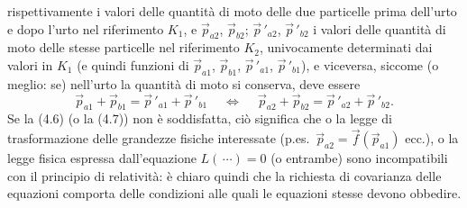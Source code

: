 rispettivamente i valori delle quantit\`a di moto delle due particelle prima
dell'urto e dopo l'urto nel riferimento $K_1$, e $\vec p_{a2}$, $\vec p_{b2}$;
$\vec p\,'_{a2}$, $\vec p\,'_{b2}$ i valori delle quantit\`a di moto delle
stesse particelle nel riferimento $K_2$, univocamente determinati dai valori in
$K_1$ (e quindi funzioni di $\vec p_{a1}$, $\vec p_{b1}$, $\vec p\,'_{a1}$,
$\vec p\,'_{b1}$), e viceversa, siccome (o meglio: se) nell'urto la quantit\`a
di moto si conserva, deve essere
\begin{equation}
  \vec p_{a1}+\vec p_{b1}=\vec p\,'_{a1}+\vec p\,'_{b1}
  \quad\ \Longleftrightarrow
  \quad\ \vec p_{a2}+\vec p_{b2}=\vec p\,'_{a2}+\vec p\,'_{b2}.
  \tag{4.7}
\end{equation}
Se la (4.6) \big(o la (4.7)\big) non \`e soddisfatta, ci\`o significa che o la
legge di trasformazione delle grandezze fisiche interessate
(p.es.\ $\vec p_{a2}=\vec f(\vec p_{a1})$ ecc.), o la legge fisica espressa
dall'equazione $L(\,\cdots)=0$ (o entrambe) sono incompatibili con il principio
di relativit\`a: \`e chiaro quindi che la richiesta di covarianza delle
equazioni comporta delle condizioni alle quali le equazioni stesse devono
obbedire.

